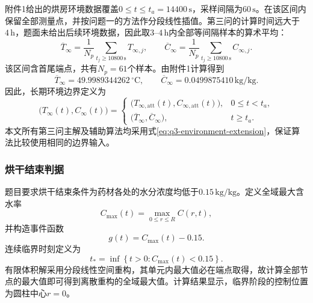 \documentclass[withoutpreface,bwprint]{cumcmthesis}
\begin{document}
附件1给出的烘房环境数据覆盖$0\le t\le t_a=14400\,\mathrm{s}$，采样间隔为$60\,\mathrm{s}$。在该区间内保留全部测量点，并按问题一的方法作分段线性插值。第三问的计算时间远大于$4\,\mathrm h$，题面未给出后续环境数据，因此取$3$--$4\,\mathrm h$内全部等间隔样本的算术平均：
\begin{equation}
\overline T_\infty=\frac{1}{N_p}
\sum_{t_j\ge10800\,\mathrm{s}}T_{\infty,j},
\qquad
\overline C_\infty=\frac{1}{N_p}
\sum_{t_j\ge10800\,\mathrm{s}}C_{\infty,j}.
\label{eq:q3-environment-average}
\end{equation}
该区间含首尾端点，共有$N_p=61$个样本。由附件1计算得到
\begin{equation}
\overline T_\infty=49.9989344262\,{}^\circ\mathrm C,
\qquad
\overline C_\infty=0.0499875410\,\mathrm{kg/kg}.
\label{eq:q3-environment-average-value}
\end{equation}
因此，长期环境边界定义为
\begin{equation}
\bigl(T_\infty(t),C_\infty(t)\bigr)=
\begin{cases}
\bigl(T_{\infty,\mathrm{att}}(t),C_{\infty,\mathrm{att}}(t)\bigr),
&0\le t<t_a,\\
\bigl(\overline T_\infty,\overline C_\infty\bigr),
&t\ge t_a.
\end{cases}
\label{eq:q3-environment-extension}
\end{equation}
本文所有第三问主解及辅助算法均采用式\eqref{eq:q3-environment-extension}，保证算法比较使用相同的边界输入。

\subsubsection{烘干结束判据}

题目要求烘干结束条件为药材各处的水分浓度均低于$0.15\,\mathrm{kg/kg}$。定义全域最大含水率
\begin{equation}
C_{\max}(t)
=
\max_{0\le r\le R}C(r,t),
\label{eq:q3-global-maximum}
\end{equation}
并构造事件函数
\begin{equation}
g(t)=C_{\max}(t)-0.15.
\label{eq:q3-event-function}
\end{equation}
连续临界时刻定义为
\begin{equation}
\boxed{
t_*
=
\inf
\left\{
t>0:C_{\max}(t)<0.15
\right\}.
}
\label{eq:q3-drying-time}
\end{equation}
有限体积解采用分段线性空间重构，其单元内最大值必在端点取得，故计算全部节点的最大值即可得到离散重构的全域最大值。计算结果显示，临界阶段的控制位置为圆柱中心$r=0$。
\end{document}

